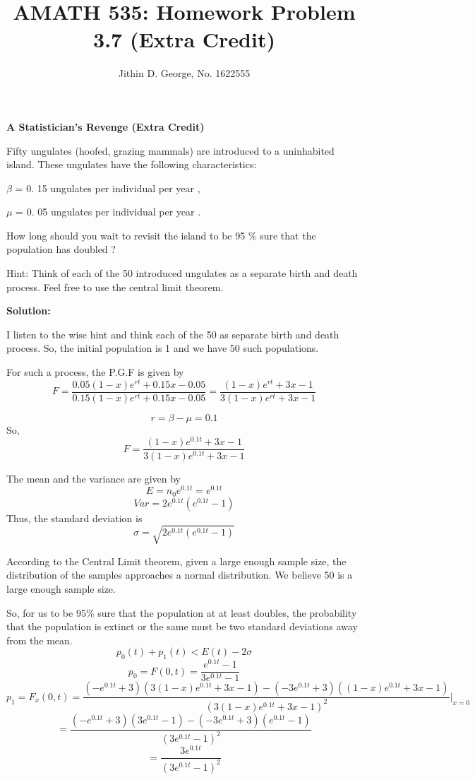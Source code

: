 \documentclass[a4paper,12pt]{article}
\title{\normalsize AMATH 535: Homework Problem 3.7 (Extra Credit)}
\author{\normalsize Jithin D. George, No. 1622555}
\begin{document}
\maketitle
	
{\bf A Statistician’s Revenge (Extra Credit)	} 


Fifty ungulates (hoofed, grazing mammals) are introduced to a
uninhabited island. These ungulates have the following characteristics:

$\beta$ = 0. 15 ungulates per individual per year ,

$\mu$ = 0. 05 ungulates per individual per year .

How long should you wait to revisit the island to be 95 \% sure that the
population has doubled ?

Hint: Think of each of the 50 introduced ungulates as a separate birth
and death process. Feel free to use the central limit theorem.

{\bf Solution:	}


I listen to the wise hint and think each of the 50 as separate birth and death process. So, the initial population is 1 and we have 50 such populations.

For such a process, the P.G.F is given by
\[ F = \frac{0.05(1-x)e^{rt} + 0.15x-0.05}{0.15(1-x)e^{rt} + 0.15x-0.05} =  \frac{(1-x)e^{rt} + 3x-1}{3(1-x)e^{rt} + 3x-1} \]

\[r = \beta - \mu = 0.1 \]
So,
\[ F =  \frac{(1-x)e^{0.1t} + 3x-1}{3(1-x)e^{0.1t} + 3x-1} \]

The mean and the variance are given by
\[E = n_0 e^{0.1t}= e^{0.1t} \]
\[Var = 2e^{0.1t}(e^{0.1t}- 1) \]
Thus, the standard deviation is 
\[ \sigma = \sqrt{2e^{0.1t}(e^{0.1t}- 1)}\]

According to the Central Limit theorem, given a large enough sample size, the distribution of the samples approaches a normal distribution. We believe 50 is a large enough sample size.

So, for us to be 95\% sure that the population at at least doubles, the probability that the population is extinct or the same must be two standard deviations away from the mean.
\[p_0(t) +p_1(t) < E(t) - 2\sigma \]
\[p_0 = F(0,t) = \frac{e^{0.1t} -1}{3e^{0.1t} -1}\]
\[p_1 = F_x(0,t) = \frac{(-e^{0.1t} + 3)(3(1-x)e^{0.1t} + 3x-1) -(-3e^{0.1t} + 3)((1-x)e^{0.1t} + 3x-1)}{(3(1-x)e^{0.1t} + 3x-1)^2} \big|_{x=0} \]
\[ =  \frac{(-e^{0.1t} + 3)(3e^{0.1t} -1) -(-3e^{0.1t} + 3)(e^{0.1t}  -1)}{(3e^{0.1t} -1)^2}\]
\[ =  \frac{3e^{0.1t}}{(3e^{0.1t} -1)^2}\]
\end{document}
